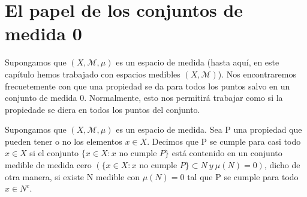 \section{El papel de los conjuntos de medida 0}

Supongamos que $(X, \mathcal{M}, \mu)$ es un espacio de medida (hasta aquí, en este capítulo hemos trabajado con espacios medibles $(X, \mathcal{M})$). Nos encontraremos frecuetemente con que una propiedad se da para todos los puntos salvo en un conjunto de medida 0. Normalmente, esto nos permitirá trabajar como si la propiedade se diera en todos los puntos del conjunto.

\begin{defi}
Supongamos que $(X, \mathcal{M}, \mu)$ es un espacio de medida. Sea P una propiedad que pueden tener o no los elementos $x \in X$. Decimos que P se cumple para casi todo $x \in X$ si el conjunto $\{ x \in X : x \text{ no cumple } P \}$ está contenido en un conjunto medible de medida cero $(\{ x \in X : x \text{ no cumple } P \} \subset N \ y \ \mu(N) = 0)$, dicho de otra manera, si existe N medible con $\mu(N) = 0$ tal que P se cumple para todo $x \in N^c$.
\end{defi}

